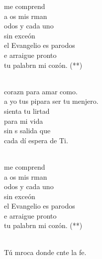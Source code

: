 \begin{cancion}%
	\begin{chorus}%
	me comprend \\
	a os mis rman  \\
	odos y cada uno\\
	sin exceón  \\
	el Evangelio es parodos\\
	e arraigue pronto\\
	tu palabrn mi cozón. (**)\\
	\end{chorus}%
	\jump\\
	 corazn para amar como. \\
	a yo tus pipara ser tu menjero.\\
	 sienta tu lirtad\\
	para  mi vida\\
	sin s salida que\\
	cada dí espera de Ti.\\\jump\\
	\begin{chorus}%
	me comprend \\
	a os mis rman  \\
	odos y cada uno\\
	sin exceón  \\
	el Evangelio es parodos\\
	e arraigue pronto\\
	tu palabrn mi cozón. (**)\\
	\end{chorus}%
	\jump\\
	 Tú mroca donde cnte la fe.\\

\end{cancion}
